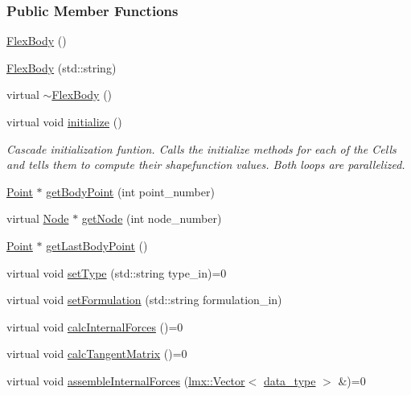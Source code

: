 \subsubsection*{Public Member Functions}
\begin{DoxyCompactItemize}
\item 
\hyperlink{classmknix_1_1_flex_body_a55ee3660c2f8d174e938972de2e62d36}{Flex\+Body} ()
\item 
\hyperlink{classmknix_1_1_flex_body_a83a9548bf5422f10ab3753d23c1d2f27}{Flex\+Body} (std\+::string)
\item 
virtual \hyperlink{classmknix_1_1_flex_body_ad5d295b774afc3b265b629a859ea22d1}{$\sim$\+Flex\+Body} ()
\item 
virtual void \hyperlink{classmknix_1_1_flex_body_aa6eeb315791be5a79d70448190ada4d4}{initialize} ()
\begin{DoxyCompactList}\small\item\em Cascade initialization funtion. Calls the initialize methods for each of the Cells and tells them to compute their shapefunction values. Both loops are parallelized. \end{DoxyCompactList}\item 
\hyperlink{classmknix_1_1_point}{Point} $\ast$ \hyperlink{classmknix_1_1_flex_body_a1e9314236b0ca0259fa3c696cde337d0}{get\+Body\+Point} (int point\+\_\+number)
\item 
virtual \hyperlink{classmknix_1_1_node}{Node} $\ast$ \hyperlink{classmknix_1_1_flex_body_a35d251c9e9329d388936af27eee5b5ff}{get\+Node} (int node\+\_\+number)
\item 
\hyperlink{classmknix_1_1_point}{Point} $\ast$ \hyperlink{classmknix_1_1_flex_body_a204c13d17b1659656c2f7fbcb1358711}{get\+Last\+Body\+Point} ()
\item 
virtual void \hyperlink{classmknix_1_1_flex_body_a0058d01bf9b5b90b22a9f4d6ca0745de}{set\+Type} (std\+::string type\+\_\+in)=0
\item 
virtual void \hyperlink{classmknix_1_1_flex_body_aa079c60afebfc32e1282246cb9045c3a}{set\+Formulation} (std\+::string formulation\+\_\+in)
\item 
virtual void \hyperlink{classmknix_1_1_flex_body_ac7bd6a11a097cd7c540d94e2c1f9d617}{calc\+Internal\+Forces} ()=0
\item 
virtual void \hyperlink{classmknix_1_1_flex_body_a7717a6111a89fa8bf0f52cd0ba77943e}{calc\+Tangent\+Matrix} ()=0
\item 
virtual void \hyperlink{classmknix_1_1_flex_body_a1ceddaab1c7db6fadd4eb8bfd3a30c48}{assemble\+Internal\+Forces} (\hyperlink{classlmx_1_1_vector}{lmx\+::\+Vector}$<$ \hyperlink{namespacemknix_a16be4b246fbf2cceb141e3a179111020}{data\+\_\+type} $>$ \&)=0

\end{DoxyCompactItemize}
